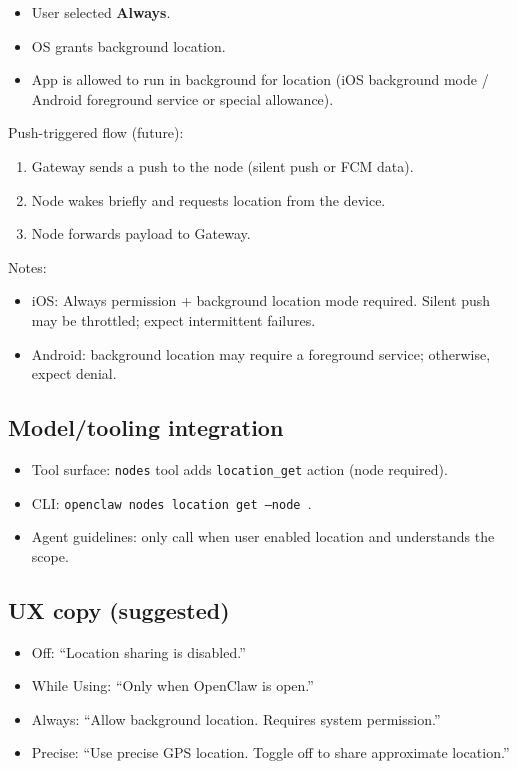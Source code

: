 \begin{itemize}
  \item User selected \textbf{Always}.
  \item OS grants background location.
  \item App is allowed to run in background for location (iOS background mode / Android foreground service or special allowance).
\end{itemize}


Push-triggered flow (future):

\begin{enumerate}
  \item Gateway sends a push to the node (silent push or FCM data).
  \item Node wakes briefly and requests location from the device.
  \item Node forwards payload to Gateway.
\end{enumerate}


Notes:

\begin{itemize}
  \item iOS: Always permission + background location mode required. Silent push may be throttled; expect intermittent failures.
  \item Android: background location may require a foreground service; otherwise, expect denial.
\end{itemize}


\subsection{Model/tooling integration}


\begin{itemize}
  \item Tool surface: \texttt{nodes} tool adds \texttt{location\_get} action (node required).
  \item CLI: \texttt{openclaw nodes location get --node }.
  \item Agent guidelines: only call when user enabled location and understands the scope.
\end{itemize}


\subsection{UX copy (suggested)}


\begin{itemize}
  \item Off: “Location sharing is disabled.”
  \item While Using: “Only when OpenClaw is open.”
  \item Always: “Allow background location. Requires system permission.”
  \item Precise: “Use precise GPS location. Toggle off to share approximate location.”
\end{itemize}



